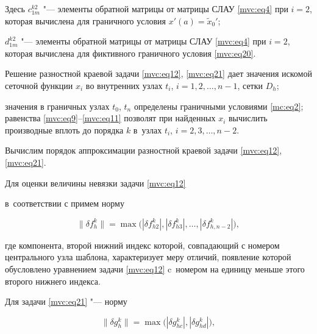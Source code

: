 Здесь $  c_{1m}^{k2}$ "--- элементы обратной матрицы от матрицы СЛАУ \eqref{mvc:eq4}  при ${i=2}$, которая вычислена для граничного условия $x'(a)=\widetilde{x}_0'$;


$  d_{1m}^{k2}$ "--- элементы обратной матрицы от матрицы СЛАУ \eqref{mvc:eq4}  при $i=2$, которая вычислена для фиктивного граничного условия \eqref{mvc:eq20}.



Решение разностной краевой задачи \eqref{mvc:eq12}, \eqref{mvc:eq21} дает значения искомой сеточной функции $x_i$ во внутренних узлах $   t_i$, $   i=1,  2,  \dots,  n-1$, сетки $   D_h$; 

значения в граничных узлах  $   t_0$, $t_n$ определены граничными условиями \eqref{mc:eq2}; равенства \eqref{mvc:eq9}--\eqref{mvc:eq11} позволят при найденных $   x_i$ вычислить производные вплоть до порядка $   k$ в~узлах $   t_i$, $   i=2,  3,  \dots,  n-2$.



\smallskip




Вычислим порядок аппроксимации разностной краевой задачи  \eqref{mvc:eq12}, \eqref{mvc:eq21}.



Для оценки величины невязки задачи \eqref{mvc:eq12}

в~соответствии с \cite{mc:bib6}  примем норму 

\begin{equation}

\label{mvc:eq25}

\|\delta f_h^k\|

=\max\bigl(|\delta f_{h2}^k|,  

|\delta f_{h3}^k|,  \dots,  |\delta f_{h,n-2}^k|\bigr),

\end{equation}

где компонента, второй нижний индекс которой, совпадающий с номером центрального узла шаблона, характеризует меру отличий, появление которой обусловлено уравнением задачи \eqref{mvc:eq12} c~номером  на единицу меньше этого второго нижнего индекса.

Для задачи \eqref{mvc:eq21} "--- норму 

\begin{equation}

\label{mvc:eq26}

\|\delta g_h^k\| %

=\max\bigl(|\delta g_{hc}^k|,  |\delta g_{hd}^k|\bigr),

\end{equation}

